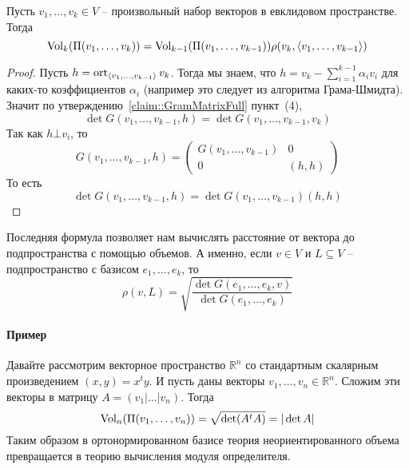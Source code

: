 \begin{claim}
Пусть $v_1,\ldots,v_k\in V$ -- произвольный набор векторов в евклидовом пространстве.
Тогда
\[
\operatorname{Vol}_k(\Pi(v_1,\ldots,v_k)) = \operatorname{Vol}_{k-1}(\Pi(v_1,\ldots,v_{k-1}))\rho(v_k, \langle v_1,\ldots,v_{k-1}\rangle)
\] 
\end{claim}
\begin{proof}
Пусть $h = \operatorname{ort}_{\langle v_1,\ldots,v_{k-1}\rangle} v_k$.
Тогда мы знаем, что $h = v_k - \sum_{i=1}^{k-1}\alpha_i v_i$ для каких-то коэффициентов $\alpha_i$ (например это следует из алгоритма Грама-Шмидта).
Значит по утверждению~\ref{claim::GramMatrixFull} пункт~(4),
\[
\det G(v_1,\ldots,v_{k-1}, h) = \det G(v_1,\ldots,v_{k-1},v_k)
\]
Так как $h \bot v_i$, то 
\[
G(v_1,\ldots,v_{k-1}, h) = 
\begin{pmatrix}
{G(v_1,\ldots,v_{k-1})}&{0}\\
{0}&{(h, h)}
\end{pmatrix}
\]
То есть 
\[
\det G(v_1,\ldots,v_{k-1}, h) = \det G(v_1,\ldots, v_{k-1}) (h, h)
\]
\end{proof}


Последняя формула позволяет нам вычислять расстояние от вектора до подпространства с помощью объемов.
А именно, если $v\in V$ и $L\subseteq V$ -- подпространство с базисом $e_1,\ldots,e_k$, то 
\[
\rho(v, L) = \sqrt{\frac{\det G(e_1,\ldots,e_k, v)}{\det G(e_1,\ldots,e_k)}}
\]

\paragraph{Пример}

Давайте рассмотрим векторное пространство $\mathbb R^n$ со стандартным скалярным произведением $(x, y) = x^ty$.
И пусть даны векторы $v_1,\ldots,v_n\in \mathbb R^n$.
Сложим эти векторы в матрицу $A = (v_1 | \ldots | v_n)$.
Тогда
\[
\operatorname{Vol}_n(\Pi(v_1,\ldots, v_n)) = \sqrt{\det(A^t A)} = |\det A|
\]
Таким образом в ортонормированном базисе теория неориентированного объема превращается в теорию вычисления модуля определителя.

